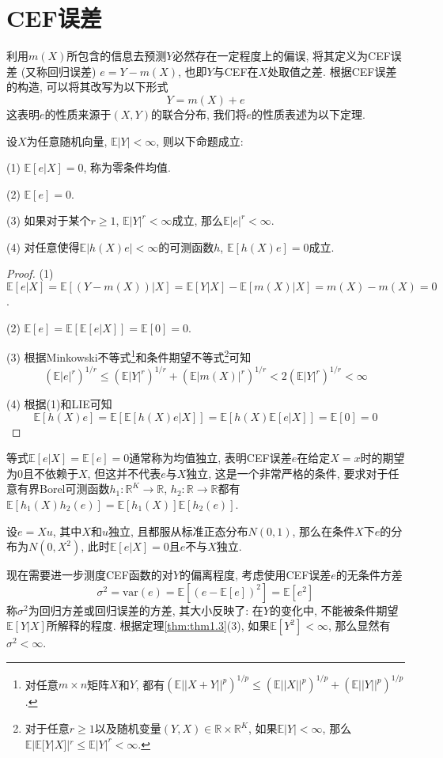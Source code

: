 \documentclass[cn, 12pt, math=mtpro2, bibstyle=apa, blue, twocol]{elegantbook}
\newcommand{\R}{\mathbb{R}}
\newcommand{\E}{\mathbb{E}}
\begin{document}
\section{CEF误差}
利用$m(X)$所包含的信息去预测$Y$必然存在一定程度上的偏误, 将其定义为CEF误差 (又称回归误差) $e=Y-m(X)$, 也即$Y$与CEF在$X$处取值之差. 根据CEF误差的构造, 可以将其改写为以下形式
\begin{equation}
  Y=m(X)+e
\end{equation}
这表明$e$的性质来源于$(X,Y)$的联合分布, 我们将$e$的性质表述为以下定理.
\begin{theorem}\label{thm:thm1.3}
  设$X$为任意随机向量, $\E|Y|<\infty$, 则以下命题成立:

  (1) $\E[e|X]=0$, 称为零条件均值.

  (2) $\E[e]=0$.

  (3) 如果对于某个$r\ge1$, $\E|Y|^r<\infty$成立, 那么$\E|e|^r<\infty$.

  (4) 对任意使得$\E|h(X)e|<\infty$的可测函数$h$, $\E[h(X)e]=0$成立.
\end{theorem}
\begin{proof}
  (1) $\E[e|X]=\E[(Y-m(X))|X]=\E[Y|X]-\E[m(X)|X]=m(X)-m(X)=0$.

  (2) $\E[e]=\E[\E[e|X]]=\E[0]=0$.

  (3) 根据Minkowski不等式\footnote{对任意$m\times n$矩阵$X$和$Y$, 都有$(\E||X+Y||^p)^{1/p}\leq (\E||X||^p)^{1/p}+(\E||Y||^p)^{1/p}$.}和条件期望不等式\footnote{对于任意$r\geq1$以及随机变量$(Y,X)\in\R\times\R^K$, 如果$\E|Y|<\infty$, 那么$\E|\E[Y|X]|^r\leq \E|Y|^r<\infty$.}可知
  $$(\E|e|^r)^{1/r}\leq (\E|Y|^r)^{1/r}+(\E|m(X)|^r)^{1/r}<2(\E|Y|^r)^{1/r}<\infty$$

  (4) 根据(1)和LIE可知
  $$\E[h(X)e]=\E[\E[h(X)e|X]]=\E[h(X)\E[e|X]]=\E[0]=0$$
\end{proof}
\begin{remark}
等式$\E[e|X]=\E[e]=0$通常称为均值独立, 表明CEF误差$e$在给定$X=x$时的期望为0且不依赖于$X$, 但这并不代表$e$与$X$独立, 这是一个非常严格的条件, 要求对于任意有界Borel可测函数$h_1:\R^K\to\R$, $h_2:\R\to\R$都有$\E[h_1(X)h_2(e)]=\E[h_1(X)]\E[h_2(e)]$.
\end{remark}
\begin{example}
设$e=Xu$, 其中$X$和$u$独立, 且都服从标准正态分布$N(0,1)$, 那么在条件$X$下$e$的分布为$N(0,X^2)$, 此时$\E[e|X]=0$且$e$不与$X$独立.
\end{example}

现在需要进一步测度CEF函数的对$Y$的偏离程度, 考虑使用CEF误差$e$的无条件方差
$$\sigma^2=\text{var}(e)=\E[(e-\E[e])^2]=\E[e^2]$$
称$\sigma^2$为回归方差或回归误差的方差, 其大小反映了: 在$Y$的变化中, 不能被条件期望$\E[Y|X]$所解释的程度. 根据定理\ref{thm:thm1.3}(3), 如果$\E[Y^2]<\infty$, 那么显然有$\sigma^2<\infty$.
\end{document}
